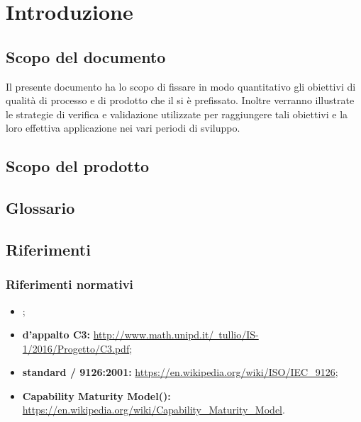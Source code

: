 \newpage

\section{Introduzione}
	\subsection{Scopo del documento}
	Il presente documento ha lo scopo di fissare in modo quantitativo gli obiettivi di qualità di processo e di prodotto che il  si è prefissato. Inoltre verranno illustrate le strategie di verifica e validazione utilizzate per raggiungere tali obiettivi e la loro effettiva applicazione nei vari periodi di sviluppo.
	\subsection{Scopo del prodotto}
	\introScopo
	\subsection{Glossario}
	\introGlossario
	\subsection{Riferimenti}
	\subsubsection{Riferimenti normativi}
	\begin{itemize}
		\item \ndpv;
		\item \textbf{ d'appalto C3:} \href{http://www.math.unipd.it/~tullio/IS-1/2016/Progetto/C3.pdf}{http://www.math.unipd.it/~tullio/IS-1/2016/Progetto/C3.pdf};
		\item \textbf{standard / 9126:2001:} \href{https://en.wikipedia.org/wiki/ISO/IEC\_9126}{https://en.wikipedia.org/wiki/ISO/IEC\_9126};
		\item \textbf{Capability Maturity Model():}
		\href{https://en.wikipedia.org/wiki/Capability\_Maturity\_Model}{https://en.wikipedia.org/wiki/Capability\_Maturity\_Model}.
		
	\end{itemize}
